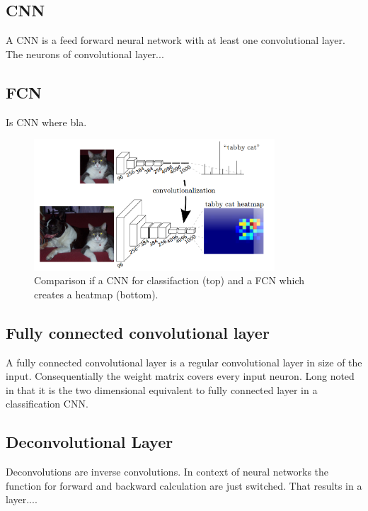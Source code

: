 \subsection{CNN}
A CNN is a feed forward neural network with at least one convolutional layer. The neurons of convolutional layer... 

\subsection{FCN}
Is CNN where bla.
\begin{figure}[htb]
	\centering
	\includegraphics[width=9cm]{figures/fcnn}
	\caption{Comparison if a CNN for classifaction (top) and a FCN which creates a heatmap (bottom). \cite{long2014fully}}
\end{figure}

\subsection{Fully connected convolutional layer}
A fully connected convolutional layer is a regular convolutional layer in size of the input. Consequentially the weight matrix covers every input neuron. Long noted in \cite{long2014fully} that it is the two dimensional equivalent to fully connected layer in a classification CNN.

\subsection{Deconvolutional Layer}
Deconvolutions are inverse convolutions. In context of neural networks the function for forward and backward calculation are just switched. That results in a layer....

